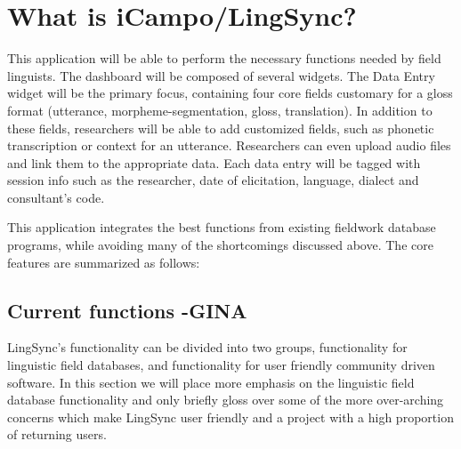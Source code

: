 \documentclass[letterpaper, 12pt, dvips]{mitwpl}
\begin{document}
\begin{description}

\end{description}



\section{What is iCampo/LingSync?}



This application will be able to perform the necessary functions needed by field linguists. The dashboard will be composed of several widgets. The Data Entry widget will be the primary focus, containing four core fields customary for a gloss format (utterance, morpheme-segmentation, gloss, translation). In addition to these fields, researchers will be able to add customized fields, such as phonetic transcription or context for an utterance.  Researchers can even upload audio files and link them to the appropriate data. Each data entry will be tagged with session info such as the researcher, date of elicitation, language, dialect and consultant's code. 

This application integrates the best functions from existing fieldwork database programs, while avoiding many of the shortcomings discussed above. The core features are summarized as follows: 


\subsection{Current functions  -GINA}

LingSync's functionality can be divided into two groups, functionality for linguistic field databases, and functionality for user friendly community driven software. In this section we will place more emphasis on the linguistic field database functionality and only briefly gloss over some of the more over-arching concerns which make LingSync user friendly and a project with a high proportion of returning users. 
\end{document}
